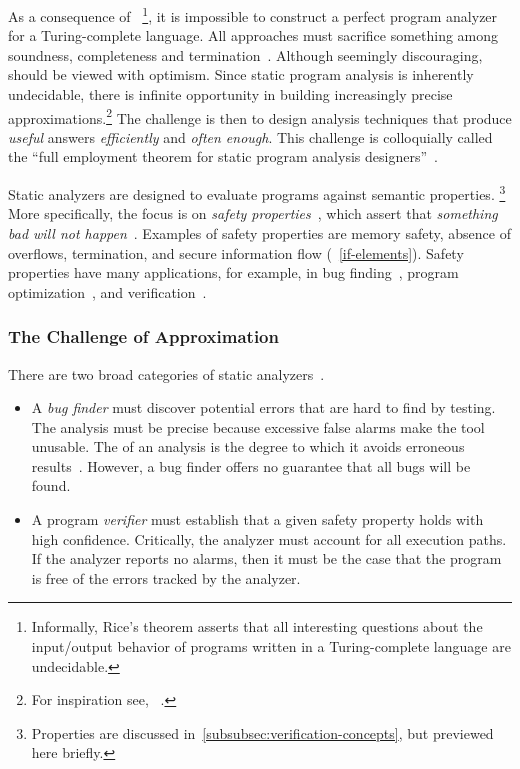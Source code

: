 As a consequence of ~\cite{rice1953}\footnote{Informally,
Rice's theorem asserts that all interesting questions about the input/output
behavior of programs written in a Turing-complete
language are undecidable.}, it is impossible to construct
a perfect program analyzer for a Turing-complete language. All approaches must
sacrifice something among soundness, completeness and
termination~\cite{moller2024}. Although seemingly discouraging,  should be viewed with optimism. Since static program analysis is
inherently undecidable, there is infinite opportunity in
building increasingly precise approximations.\footnote{For inspiration see,
\eg~\textcite{ding2023}.} The challenge is then to design analysis techniques
that produce \emph{useful} answers \emph{efficiently} and \emph{often enough}.
This challenge is colloquially called the \enquote{full employment theorem for
static program analysis designers}~\cite[p. 4]{moller2023}.

Static analyzers are designed to evaluate programs against semantic properties.%
\footnote{Properties are discussed in~\autoref{subsubsec:verification-concepts},
but previewed here briefly.} More specifically, the focus is on \emph{safety
properties}~\cite[p. 6]{moller2023}, which assert that \emph{something bad will
not happen}~\cite{lamport1977}. Examples of safety properties are memory safety,
absence of overflows, termination, and secure information flow
(\cf~\autoref{if-elements}). Safety properties have many applications, for
example, in bug finding~\cite{popeea2010}, program
optimization~\cite{rinard1996}, and verification~\cite{falcone2009}.

\subsubsection{The Challenge of Approximation}\label{static-approx}

There are two broad categories of static analyzers~\cite{jourdan2015}.

\begin{itemize}

\item A \emph{bug finder} must discover potential errors that are hard to find
by testing. The analysis must be precise because
excessive false alarms make the tool unusable. The \emph{} of an
analysis is the degree to which it avoids erroneous results~\cite{livshits2015}.
However, a bug finder offers no guarantee that all bugs will be found.

\item A program \emph{verifier} must establish that a given safety property
holds with high confidence. Critically, the analyzer must account for all
execution paths. If the analyzer reports no alarms, then it must be the case
that the program is free of the errors tracked by the analyzer.

\end{itemize}

